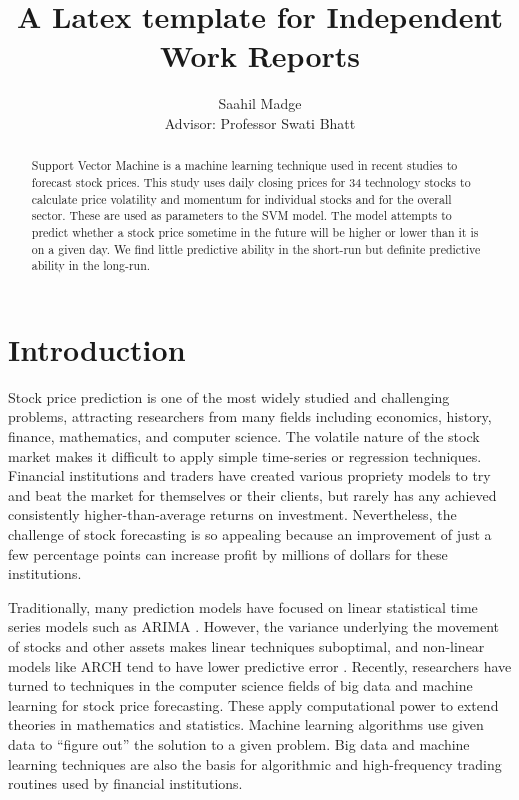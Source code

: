 \documentclass[pageno]{jpaper}
\begin{document}
\title{
A Latex template for Independent Work Reports}
\author{Saahil Madge \\ Advisor: Professor Swati Bhatt}

\date{}
\maketitle

\thispagestyle{empty}

\begin{abstract}
\bigskip
Support Vector Machine is a machine learning technique used in recent studies to forecast stock prices. This study uses daily closing prices for 34 technology stocks to calculate price volatility and momentum for individual stocks and for the overall sector. These are used as parameters to the SVM model. The model attempts to predict whether a stock price sometime in the future will be higher or lower than it is on a given day. We find little predictive ability in the short-run but definite predictive ability in the long-run.
\end{abstract}

\section{Introduction}

Stock price prediction is one of the most widely studied and challenging problems, attracting researchers from many fields including economics, history, finance, mathematics, and computer science. The volatile nature of the stock market makes it difficult to apply simple time-series or regression techniques. Financial institutions and traders have created various propriety models to try and beat the market for themselves or their clients, but rarely has any achieved consistently higher-than-average returns on investment. Nevertheless, the challenge of stock forecasting is so appealing because an improvement of just a few percentage points can increase profit by millions of dollars for these institutions.

Traditionally, many prediction models have focused on linear statistical time series models such as ARIMA \cite{bontempi}. However, the variance underlying the movement of stocks and other assets makes linear techniques suboptimal, and non-linear models like ARCH tend to have lower predictive error \cite{zhang}. Recently, researchers have turned to techniques in the computer science fields of big data and machine learning for stock price forecasting. These apply computational power to extend theories in mathematics and statistics. Machine learning algorithms use given data to ``figure out'' the solution to a given problem. Big data and machine learning techniques are also the basis for algorithmic and high-frequency trading routines used by financial institutions.
\end{document}
